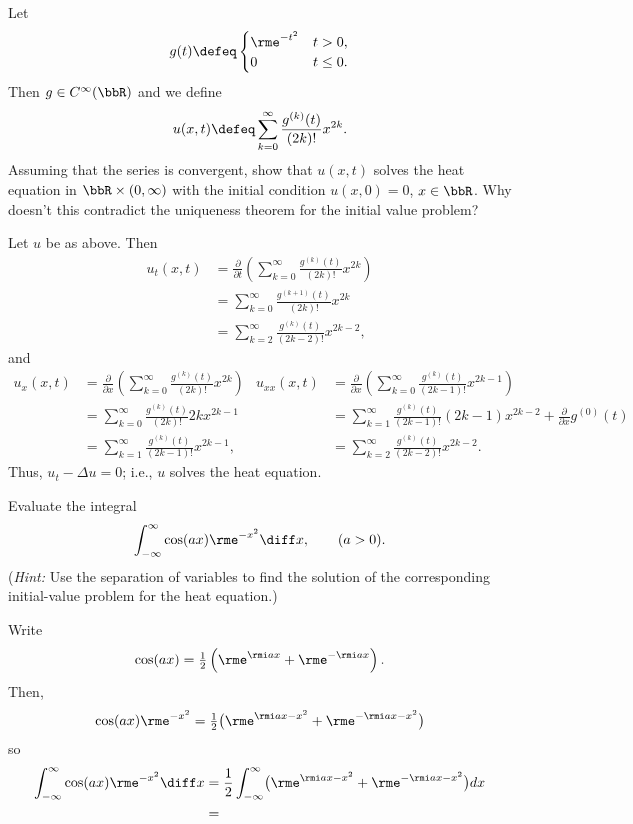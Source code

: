 \newpage

\begin{problem}
  Let
  \[
    g(t)\defeq
    \begin{cases}
      \rme^{-t^2}&t>0,\\
      0&t\leq 0.
    \end{cases}
  \]
  Then \(g\in C^\infty(\bbR)\) and we define
  \[
    u(x,t)\defeq\sum_{k=0}^\infty\frac{g^{(k)}(t)}{(2k)!}x^{2k}.
  \]
  Assuming that the series is convergent, show that \(u(x,t)\) solves the
  heat equation in \(\bbR\times(0,\infty)\) with the initial condition
  \(u(x,0)=0\), \(x\in\bbR\). Why doesn't this contradict the uniqueness
  theorem for the initial value problem?
\end{problem}
\begin{solution}
  Let \(u\) be as above. Then
  \begin{align*}
    u_t(x,t)
    &=\frac{\partial}{\partial t}
      \left(
      \sum_{k=0}^\infty\frac{g^{(k)}(t)}{(2k)!}x^{2k}
      \right)\\
    &=\sum_{k=0}^\infty \frac{g^{(k+1)}(t)}{(2k)!}x^{2k}\\
    &=\sum_{k=2}^\infty \frac{g^{(k)}(t)}{(2k-2)!}x^{2k-2},
  \end{align*}
  and
  \begin{align*}
    u_x(x,t)
    &=\frac{\partial}{\partial x}
      \left(
      \sum_{k=0}^\infty\frac{g^{(k)}(t)}{(2k)!}x^{2k}
      \right)
    &u_{xx}(x,t)
    &=\frac{\partial}{\partial x}
      \left(
      \sum_{k=0}^\infty\frac{g^{(k)}(t)}{(2k-1)!}x^{2k-1}
      \right)\\
    &=\sum_{k=0}^\infty\frac{g^{(k)}(t)}{(2k)!} 2kx^{2k-1}
    &&=\sum_{k=1}^\infty \frac{g^{(k)}(t)}{(2k-1)!}(2k-1)x^{2k-2}
       +\tfrac{\partial}{\partial x}g^{(0)}(t)\\
    &=\sum_{k=1}^\infty\frac{g^{(k)}(t)}{(2k-1)!}x^{2k-1},
    &&=\sum_{k=2}^\infty\frac{g^{(k)}(t)}{(2k-2)!}x^{2k-2}.
  \end{align*}
  Thus, \(u_t-\Delta u=0\); i.e., \(u\) solves the heat equation.
\end{solution}
\newpage

\begin{problem}
  Evaluate the integral
  \[
    \int_{-\infty}^\infty \cos(ax)\rme^{-x^2}\diff x,\qquad (a>0).
  \]
  \noindent (\emph{Hint:} Use the separation of variables to find the
  solution of the corresponding initial-value problem for the heat
  equation.)
\end{problem}
\begin{solution}
  Write
  \[
    \cos(ax)=\tfrac{1}{2}\left(\rme^{\rmi ax}+\rme^{-\rmi ax}\right).
  \]
  Then,
  \[
    \cos(ax)\rme^{-x^2}=\tfrac{1}{2}
    \bigl(\rme^{\rmi ax-x^2}+\rme^{-\rmi ax-x^2}\bigr)
  \]
  so
  \begin{align*}
    \int_{-\infty}^\infty \cos(ax)\rme^{-x^2}\diff x
    &=\frac{1}{2}\int_{-\infty}^\infty
      \bigl(\rme^{\rmi ax-x^2}+\rme^{-\rmi ax-x^2}\bigr)dx\\
    &=
  \end{align*}
\end{solution}

